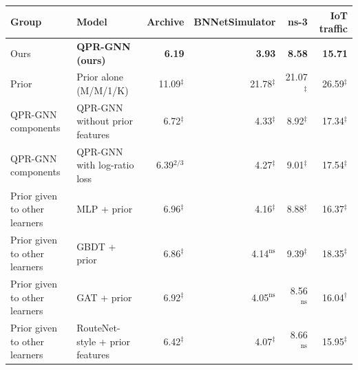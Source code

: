 \begin{tabular}{llrrrr}
\toprule
Group & Model & Archive & BNNetSimulator & ns-3 & IoT traffic \\
\midrule
Ours & \textbf{QPR-GNN (ours)} & \textbf{6.19} & \textbf{3.93} & \textbf{8.58} & \textbf{15.71} \\
Prior & Prior alone (M/M/1/K) & 11.09$^\ddagger$ & 21.78$^\ddagger$ & 21.07$^\ddagger$ & 26.59$^\ddagger$ \\
QPR-GNN components & QPR-GNN without prior features & 6.72$^\ddagger$ & 4.33$^\ddagger$ & 8.92$^\ddagger$ & 17.34$^\ddagger$ \\
QPR-GNN components & QPR-GNN with log-ratio loss & 6.39$^{2/3}$ & 4.27$^\ddagger$ & 9.01$^\ddagger$ & 17.54$^\ddagger$ \\
Prior given to other learners & MLP + prior & 6.96$^\ddagger$ & 4.16$^\ddagger$ & 8.88$^\ddagger$ & 16.37$^\ddagger$ \\
Prior given to other learners & GBDT + prior & 6.86$^\ddagger$ & 4.14$^{\mathrm{ns}}$ & 9.39$^\ddagger$ & 18.35$^\ddagger$ \\
Prior given to other learners & GAT + prior & 6.92$^\ddagger$ & 4.05$^{\mathrm{ns}}$ & 8.56$^{\mathrm{ns}}$ & 16.04$^\dagger$ \\
Prior given to other learners & RouteNet-style + prior features & 6.42$^\ddagger$ & 4.07$^\ddagger$ & 8.66$^{\mathrm{ns}}$ & 15.95$^\ddagger$ \\
\bottomrule
\end{tabular}

